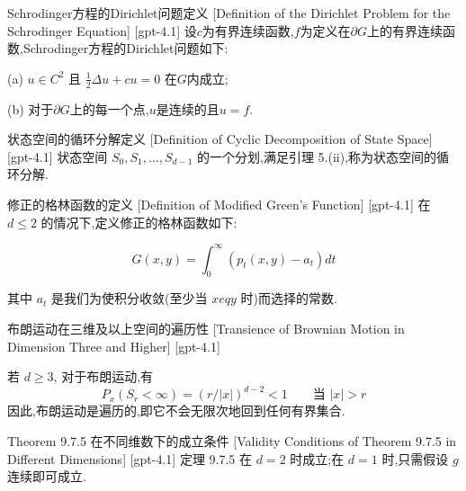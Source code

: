 \documentclass[UTF8]{ctexart}
\begin{document}
    
    
    \begin{dfn}
        {Schrodinger方程的Dirichlet问题定义}
        [Definition of the Dirichlet Problem for the Schrodinger Equation]
        [gpt-4.1]
        设$c$为有界连续函数,$f$为定义在$\partial G$上的有界连续函数,Schrodinger方程的Dirichlet问题如下:

(a) $u \in C^{2}$ 且 $\frac{1}{2} \Delta u + c u = 0$ 在$G$内成立;

(b) 对于$\partial G$上的每一个点,$u$是连续的且$u = f$.
    \end{dfn}
    
    
    
    \begin{dfn}
        {状态空间的循环分解定义}
        [Definition of Cyclic Decomposition of State Space]
        [gpt-4.1]
        状态空间 $S_{0}, S_{1}, \ldots, S_{d-1}$ 的一个分划,满足引理 5.(ii),称为状态空间的循环分解.
    \end{dfn}
    
    
    
    \begin{dfn}
        {修正的格林函数的定义}
        [Definition of Modified Green's Function]
        [gpt-4.1]
        在 $d \leq 2$ 的情况下,定义修正的格林函数如下:

\[
G(x, y) = \int_{0}^{\infty} (p_{t}(x, y) - a_{t}) dt
\]

其中 $a_{t}$ 是我们为使积分收敛(至少当 $x 
eq y$ 时)而选择的常数.
    \end{dfn}
    
    
    
    \begin{thm}
        {布朗运动在三维及以上空间的遍历性}
        [Transience of Brownian Motion in Dimension Three and Higher]
        [gpt-4.1]
        
若 $d \ge 3$, 对于布朗运动,有
\[
P_{x}(S_{r} < \infty) = (r / |x|)^{d-2} < 1 \qquad \text{当 } |x| > r
\]
因此,布朗运动是遍历的,即它不会无限次地回到任何有界集合.

    \end{thm}
    
    
    
    \begin{thm}
        {Theorem 9.7.5 在不同维数下的成立条件}
        [Validity Conditions of Theorem 9.7.5 in Different Dimensions]
        [gpt-4.1]
        定理 9.7.5 在 $d = 2$ 时成立;在 $d = 1$ 时,只需假设 $g$ 连续即可成立.
    \end{thm}
    
\end{document}
